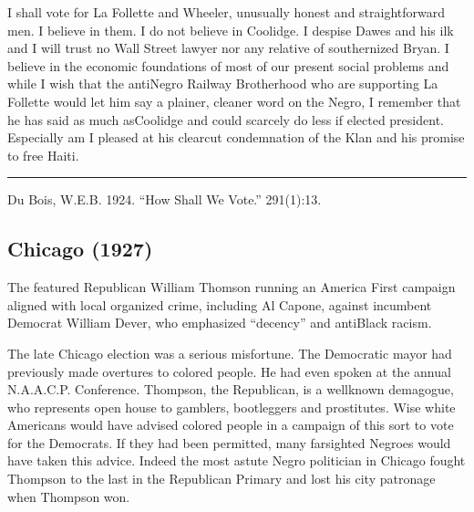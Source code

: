 \documentclass[letterpaper,10pt,english]{jupyterBook}
\begin{document}
\sphinxAtStartPar
I shall vote for La Follette and Wheeler, unusually honest and straight\sphinxhyphen{}forward men. I believe in them. I do not believe in Coolidge. I despise Dawes and his ilk and I will trust no Wall Street lawyer nor any relative of southernized Bryan. I believe in the economic foundations of most of our present social problems and while I wish that the anti\sphinxhyphen{}Negro Railway Brotherhood who are supporting La Follette would let him say a plainer, cleaner word on the Negro, I remember that he has said as much as\sphinxhyphen{}Coolidge and could scarcely do less if elected president. Especially am I pleased at his clear\sphinxhyphen{}cut condemnation of the Klan and his promise to free Haiti.

\sphinxAtStartPar
{}


\bigskip\hrule\bigskip


\sphinxAtStartPar
{} Du Bois, W.E.B. 1924. “How Shall We Vote.” 291(1):13.


\subsection{Chicago (1927)}
\label{\detokenize{Volumes/34/04/chicago:chicago-1927}}\label{\detokenize{Volumes/34/04/chicago::doc}}
\begin{sphinxShadowBox}
\sphinxstylesidebartitle{}

\sphinxAtStartPar
The  featured Republican William Thomson running an America First campaign aligned with local organized crime, including Al Capone, against incumbent Democrat William Dever, who emphasized “decency” and anti\sphinxhyphen{}Black racism.
\end{sphinxShadowBox}

\sphinxAtStartPar
The late Chicago election was a serious misfortune. The Democratic mayor had previously made overtures to colored people. He had even spoken at the annual N.A.A.C.P. Conference. Thompson, the Republican, is a well\sphinxhyphen{}known demagogue, who represents open house to gamblers, bootleggers and prostitutes. Wise white Americans would have advised colored people in a campaign of this sort to vote for the Democrats. If they had been permitted, many far\sphinxhyphen{}sighted Negroes would have taken this advice. Indeed the most astute Negro politician in Chicago fought Thompson to the last in the Republican Primary and lost his city patronage when Thompson won.
\end{document}
